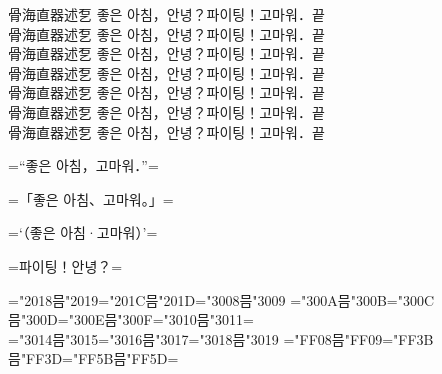\documentclass{ujarticle}
\begin{document}
\upkorrml 骨海直器述乭 좋은 아침，안녕？파이팅！고마워．끝\\
\upkorrmm 骨海直器述乭 좋은 아침，안녕？파이팅！고마워．끝\\
\upkorrmb 骨海直器述乭 좋은 아침，안녕？파이팅！고마워．끝\\
\upkorgtm 骨海直器述乭 좋은 아침，안녕？파이팅！고마워．끝\\
\upkorgtb 骨海直器述乭 좋은 아침，안녕？파이팅！고마워．끝\\
\upkorgte 骨海直器述乭 좋은 아침，안녕？파이팅！고마워．끝\\
\upkorgth 骨海直器述乭 좋은 아침，안녕？파이팅！고마워．끝\\

\upkorrmm

=“좋은 아침，고마워．”=

=「좋은 아침、고마워。」=

=‘（좋은 아침·고마워）’=

=파이팅！안녕？=

=\kchar"2018믐\kchar"2019=\kchar"201C믐\kchar"201D=\kchar"3008믐\kchar"3009%
=\kchar"300A믐\kchar"300B=\kchar"300C믐\kchar"300D=\kchar"300E믐\kchar"300F=\kchar"3010믐\kchar"3011=\\
=\kchar"3014믐\kchar"3015=\kchar"3016믐\kchar"3017=\kchar"3018믐\kchar"3019%
=\kchar"FF08믐\kchar"FF09=\kchar"FF3B믐\kchar"FF3D=\kchar"FF5B믐\kchar"FF5D=
\end{document}
